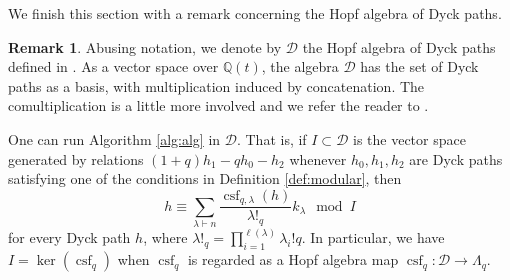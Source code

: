 \documentclass[10pt]{amsart}
\theoremstyle{definition}
\newtheorem{Rem}[Lem]{Remark}
\newcommand{\col}{\colon}
\newcommand{\D}{\mathcal{D}}
\DeclareMathOperator{\csf}{csf}
\begin{document}
We finish this section with a remark concerning the Hopf algebra of Dyck paths.

\begin{Rem}
  Abusing notation, we denote by $\mathcal{D}$ the Hopf algebra of Dyck paths defined in \cite{GP}. As a vector space over $\mathbb{Q}(t)$, the algebra $\D$ has the set of Dyck paths as a basis, with multiplication induced by concatenation. The comultiplication is a little more involved and we refer the reader to \cite{GP}.\par
  One can run Algorithm \ref{alg:alg} in $\mathcal{D}$. That is, if $I\subset \mathcal{D}$ is the vector space generated by relations $(1+q)h_1-qh_0-h_2$ whenever $h_0,h_1,h_2$ are Dyck paths satisfying one of the conditions in Definition \ref{def:modular}, then
\[
h\equiv \sum_{\lambda\vdash n}\frac{\csf_{q,\lambda}(h)}{\lambda!_q}k_{\lambda}\mod I
\]
for every Dyck path $h$, where $\lambda!_q=\prod_{i=1}^{\ell(\lambda)}\lambda_i!q$. In particular, we have $I=\ker(\csf_q)$ when $\csf_q$ is regarded as a Hopf algebra map $\csf_q\col \mathcal{D}\to \Lambda_q$.
\end{Rem}
\end{document}

